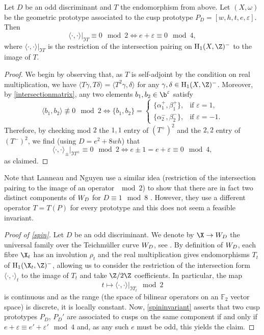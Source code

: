 \documentclass{amsart}
\renewcommand{\H}%
{\mathrm{H}}
\def\ep{\varepsilon}
\begin{document}
\begin{prop}\label{spininvariant}
Let $D$ be an odd discriminant and $T$ the endomorphism from above. Let $(X,\omega)$ be the geometric prototype associated to the cusp prototype $P_D=[w,h,t,e,\ep]$. Then
\[\langle\cdot,\cdot\rangle|_{\Im T}\equiv 0\mod 2\iff e+\ep\equiv 0\mod 4,\]
where $\langle\cdot,\cdot\rangle|_{\Im T}$ is the restriction of the intersection pairing on $\H_1(X,\Z)^-$ to the image of $T$.
\end{prop}

\begin{proof}
We begin by observing that, as $T$ is self-adjoint by the condition on real multiplication, we have $\langle T\gamma,T\delta\rangle=\langle T^2\gamma,\delta\rangle$ for any $\gamma,\delta\in\H_1(X,\Z)^-$. Moreover, by \eqref{intersectionmatrix}, any two elements $b_1,b_2\in\b^\ep$ satisfy
\[\langle b_1,b_2\rangle\not\equiv 0\mod 2\iff \{b_1,b_2\}=\begin{cases}\{\alpha^+_1,\beta^+_1\},&\text{if $\ep=1$,}\\\{\alpha^-_2,\beta^-_2\},&\text{if $\ep=-1$.}\end{cases}\]
Therefore, by checking mod $2$ the $1,1$ entry of $(T^+)^2$ and the $2,2$ entry of $(T^-)^2$, we find (using $D=e^2+8wh$) that
\[\langle\cdot,\cdot\rangle_\pm|_{\Im T^\pm}\equiv 0\mod 2\iff e\pm1=e+\ep\equiv 0\mod 4,\]
as claimed.
\end{proof}

\begin{rem}
Note that Lanneau and Nguyen use a similar idea (restriction of the intersection pairing to the image of an operator $\mod 2$) to show that there are in fact two distinct components of $\W$ for $D\equiv 1\mod 8$ \cite[Theorem 6.1]{lanneaunguyen}. However, they use a different operator $T=T(P)$ for every prototype and this does not seem a feasible invariant.
\end{rem}

\begin{proof}[Proof of \autoref{spin}]
Let $D$ be an odd discriminant. We denote by $\X\rightarrow\W$ the universal family over the Teichmüller curve $\W$, see \cite[\S 1.4]{VHS}. By definition of $\W$, each fibre $\X_t$ has an involution $\rho_t$ and the real multiplication gives endomorphisms $T_t$ of $\H_1(\X_t,\Z)^-$, allowing us to consider the restriction of the intersection form $\langle\cdot,\cdot\rangle_t$ to the image of $T_t$ and take $\Z/2\Z$ coefficients. In particular, the map 
\[t\mapsto\langle\cdot,\cdot\rangle|_{\Im T_t}\mod 2\]
is continuous and as the range (the space of bilinear operators on an $\mathbb{F}_2$ vector space) is discrete, it is locally constant. Now, \autoref{spininvariant} asserts that two cusp prototypes $P_D$, $P_D'$ are associated to cusps on the same component if and only if $e+\ep\equiv e'+\ep'\mod 4$ and, as any such $e$ must be odd, this yields the claim.
\end{proof}
\end{document}
